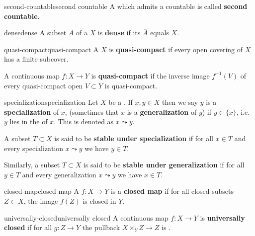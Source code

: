 \begin{topic}{second-countable}{second countable}
    A  which admits a countable  is called \textbf{second countable}.
\end{topic}

\begin{topic}{dense}{dense}
    A subset $A$ of a  $X$ is \textbf{dense} if its  $\overline{A}$ equals $X$.
\end{topic}

\begin{topic}{quasi-compact}{quasi-compact}
    A  $X$ is \textbf{quasi-compact} if every open covering of $X$ has a finite subcover.
    
    A continuous map $f : X \to Y$ is \textbf{quasi-compact} if the inverse image $f^{-1}(V)$ of every quasi-compact open $V \subset Y$ is quasi-compact.
\end{topic}

\begin{topic}{specialization}{specialization}
    Let $X$ be a . If $x, y \in X$ then we say $y$ is a \textbf{specialization} of $x$, (sometimes that $x$ is a \textbf{generalization} of $y$) if $y \in \overline{\{ x \}}$, i.e. $y$ lies in the  of $x$. This is denoted as $x \leadsto y$.
    
    A subset $T \subset X$ is said to be \textbf{stable under specialization} if for all $x \in T$ and every specialization $x \leadsto y$ we have $y \in T$.
    
    Similarly, a subset $T \subset X$ is said to be \textbf{stable under generalization} if for all $y \in T$ and every generalization $x \leadsto y$ we have $x \in T$.
\end{topic}

\begin{topic}{closed-map}{closed map}
    A  $f : X \to Y$ is a \textbf{closed map} if for all closed subsets $Z \subset X$, the image $f(Z)$ is closed in $Y$.
\end{topic}

\begin{topic}{universally-closed}{universally closed}
    A continuous map $f : X \to Y$ is \textbf{universally closed} if for all $g : Z \to Y$ the pullback $X \times_Y Z \to Z$ is .
\end{topic}

